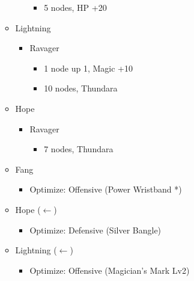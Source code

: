 \begin{multicols}{2}
\begin{menu}
\begin{itemize}
\begin{itemize}
\begin{itemize}
\begin{itemize}
                        \item 5 nodes, HP +20
                      \end{itemize}
              \end{itemize}
        \item Lightning
              \begin{itemize}
                \item Ravager
                      \begin{itemize}
                        \item 1 node up 1, Magic +10
                        \item 10 nodes, Thundara
                      \end{itemize}
              \end{itemize}
        \item Hope
              \begin{itemize}
                \item Ravager
                      \begin{itemize}
                        \item 7 nodes, Thundara
                      \end{itemize}
              \end{itemize}
      \end{itemize}
      \equip
      \begin{itemize}
        \item Fang
              \begin{itemize}
                \item Optimize: Offensive (Power Wristband *)
              \end{itemize}
        \item Hope ($\leftarrow$)
              \begin{itemize}
                \item Optimize: Defensive (Silver Bangle)
              \end{itemize}
        \item Lightning ($\leftarrow$)
              \begin{itemize}
                \item Optimize: Offensive (Magician's Mark Lv2)
              \end{itemize}
      \end{itemize}
    \end{itemize}
  \end{menu}


\end{multicols}
